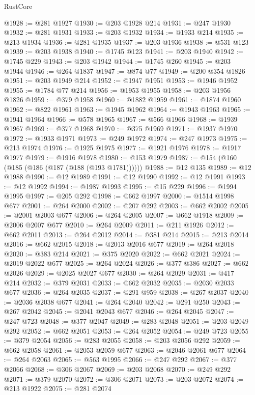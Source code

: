 \begin{lexlean}{RustCore}
\begin{coremodule}
@1928 := @281 @1927
@1930 := @203 @1928 @214
@1931 := @247 @1930
@1932 := @281 @1931
@1933 := @203 @1932
@1934 := @1933 @214
@1935 := @213 @1934
@1936 := @281 @1935
@1937 := @203 @1936
@1938 := @531 @123
@1939 := @203 @1938
@1940 := @1745 @123
@1941 := @203 @1940
@1942 := @1745 @229
@1943 := @203 @1942
@1944 := @1745 @260
@1945 := @203 @1944
@1946 := @264 @1837
@1947 := @874 @77
@1949 := @200 @354 @1826
@1951 := @203 @1949 @214
@1952 := @1947 @1951
@1953 := @1946 @1952
@1955 := @1784 @77 @214
@1956 := @1953 @1955
@1958 := @203 @1956 @1826
@1959 := @379 @1958
@1960 := @1882 @1959
@1961 := @1874 @1960
@1962 := @822 @1961
@1963 := @1945 @1962
@1964 := @1943 @1963
@1965 := @1941 @1964
@1966 := @578 @1965
@1967 := @566 @1966
@1968 := @1939 @1967
@1969 := @377 @1968
@1970 := @375 @1969
@1971 := @1937 @1970
@1972 := @1933 @1971
@1973 := @249 @1972
@1974 := @247 @1973
@1975 := @213 @1974
@1976 := @1925 @1975
@1977 := @1921 @1976
@1978 := @1917 @1977
@1979 := @1916 @1978
@1980 := @153 @1979
@1987 := @154 (@160 (@185 (@186 (@187 (@188 (@193 @1781))))))
@1988 := @12 @135
@1989 := @12 @1988
@1990 := @12 @1989
@1991 := @12 @1990
@1992 := @12 @1991
@1993 := @12 @1992
@1994 := @1987 @1993
@1995 := @15 @229
@1996 := @1994 @1995
@1997 := @205 @292
@1998 := @662 @1997
@2000 := @1514 @1998 @677
@2001 := @264 @2000
@2002 := @207 @292
@2003 := @662 @2002
@2005 := @2001 @2003 @677
@2006 := @264 @2005
@2007 := @662 @1918
@2009 := @2006 @2007 @677
@2010 := @264 @2009
@2011 := @211 @1926
@2012 := @662 @2011
@2013 := @264 @2012
@2014 := @381 @214
@2015 := @213 @2014
@2016 := @662 @2015
@2018 := @2013 @2016 @677
@2019 := @264 @2018
@2020 := @383 @214
@2021 := @375 @2020
@2022 := @662 @2021
@2024 := @2019 @2022 @677
@2025 := @264 @2024
@2026 := @377 @386
@2027 := @662 @2026
@2029 := @2025 @2027 @677
@2030 := @264 @2029
@2031 := @417 @214
@2032 := @379 @2031
@2033 := @662 @2032
@2035 := @2030 @2033 @677
@2036 := @264 @2035
@2037 := @291 @959
@2038 := @267 @2037
@2040 := @2036 @2038 @677
@2041 := @264 @2040
@2042 := @291 @250
@2043 := @267 @2042
@2045 := @2041 @2043 @677
@2046 := @264 @2045
@2047 := @247 @723
@2048 := @377 @2047
@2049 := @283 @2048
@2051 := @203 @2049 @292
@2052 := @662 @2051
@2053 := @264 @2052
@2054 := @249 @723
@2055 := @379 @2054
@2056 := @283 @2055
@2058 := @203 @2056 @292
@2059 := @662 @2058
@2061 := @2053 @2059 @677
@2063 := @2046 @2061 @677
@2064 := @264 @2063
@2065 := @563 @1995
@2066 := @247 @292
@2067 := @377 @2066
@2068 := @306 @2067
@2069 := @203 @2068
@2070 := @249 @292
@2071 := @379 @2070
@2072 := @306 @2071
@2073 := @203 @2072
@2074 := @213 @1922
@2075 := @281 @2074

\end{coremodule}
\end{lexlean}

